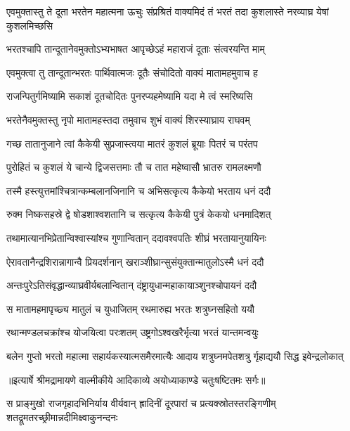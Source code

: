 \threelineshloka
{एवमुक्तास्तु ते दूता भरतेन महात्मना}
{ऊचुः संप्रश्रितं वाक्यमिदं तं भरतं तदा}
{कुशलास्ते नरव्याघ्र येषां कुशलमिच्छसि} %

\twolineshloka
{भरतश्चापि तान्दूतानेवमुक्तोऽभ्यभाषत}
{आपृच्छेऽहं महाराजं दूताः संत्वरयन्ति माम्} %

\twolineshloka
{एवमुक्त्वा तु तान्दूतान्भरतः पार्थिवात्मजः}
{दूतैः संचोदितो वाक्यं मातामहमुवाच ह} %

\twolineshloka
{राजन्पितुर्गमिष्यामि सकाशं दूतचोदितः}
{पुनरप्यहमेष्यामि यदा मे त्वं स्मरिष्यसि} %

\twolineshloka
{भरतेनैवमुक्तस्तु नृपो मातामहस्तदा}
{तमुवाच शुभं वाक्यं शिरस्याघ्राय राघवम्} %

\twolineshloka
{गच्छ तातानुजाने त्वां कैकेयी सुप्रजास्त्वया}
{मातरं कुशलं ब्रूयाः पितरं च परंतप} %

\twolineshloka
{पुरोहितं च कुशलं ये चान्ये द्विजसत्तमाः}
{तौ च तात महेष्वासौ भ्रातरु रामलक्ष्मणौ} %

\twolineshloka
{तस्मै हस्त्युत्तमांश्चित्रान्कम्बलानजिनानि च}
{अभिसत्कृत्य कैकेयो भरताय धनं ददौ} %

\twolineshloka
{रुक्म निष्कसहस्रे द्वे षोडशाश्वशतानि च}
{सत्कृत्य कैकेयी पुत्रं केकयो धनमादिशत्} %

\twolineshloka
{तथामात्यानभिप्रेतान्विश्वास्यांश्च गुणान्वितान्}
{ददावश्वपतिः शीघ्रं भरतायानुयायिनः} %

\twolineshloka
{ऐरावतानैन्द्रशिरान्नागान्वै प्रियदर्शनान्}
{खराञ्शीघ्रान्सुसंयुक्तान्मातुलोऽस्मै धनं ददौ} %

\twolineshloka
{अन्तःपुरेऽतिसंवृद्धान्व्याघ्रवीर्यबलान्वितान्}
{दंष्ट्रायुधान्महाकायाञ्शुनश्चोपायनं ददौ} %

\twolineshloka
{स मातामहमापृच्छ्य मातुलं च युधाजितम्}
{रथमारुह्य भरतः शत्रुघ्नसहितो ययौ} %

\twolineshloka
{रथान्मण्डलचक्रांश्च योजयित्वा परःशतम्}
{उष्ट्रगोऽश्वखरैर्भृत्या भरतं यान्तमन्वयुः} %

\fourlineindentedshloka
{बलेन गुप्तो भरतो महात्मा}
{ सहार्यकस्यात्मसमैरमात्यैः}
{आदाय शत्रुघ्नमपेतशत्रु}
{र्गृहाद्ययौ सिद्ध इवेन्द्रलोकात्} %


{॥इत्यार्षे श्रीमद्रामायणे वाल्मीकीये आदिकाव्ये अयोध्याकाण्डे चतुःषष्टितमः सर्गः॥}


\threelineshloka
{स प्राङ्मुखो राजगृहादभिनिर्याय वीर्यवान्}
{ह्रादिनीं दूरपारां च प्रत्यक्स्रोतस्तरङ्गिणीम्}
{शतद्रूमतरच्छ्रीमान्नदीमिक्ष्वाकुनन्दनः} %

